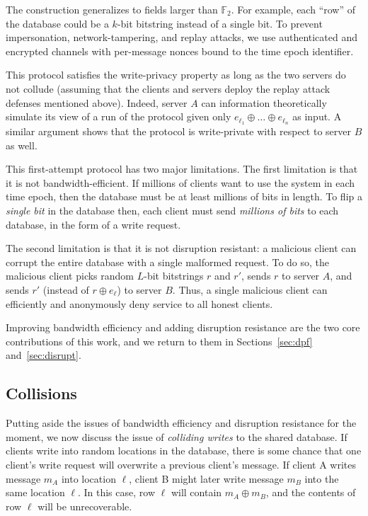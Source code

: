 \documentclass[10pt,twocolumn]{article}
\newcommand{\F}{\mathbb{F}}
\begin{document}
The construction generalizes to fields larger than $\F_2$.
For example, each ``row'' of the database could be a $k$-bit bitstring
instead of a single bit.
To prevent impersonation, network-tampering, and replay attacks, we 
use authenticated and encrypted channels with per-message nonces
bound to the time epoch identifier. 

\medskip

This protocol satisfies the write-privacy property
as long as the two servers do not collude (assuming that the clients
and servers deploy the replay attack defenses mentioned above).
Indeed, server $A$ can information theoretically simulate its view 
of a run of the protocol given only $e_{\ell_1} \oplus \dots \oplus e_{\ell_n}$ as input.
A similar argument shows that the protocol is write-private with
respect to server $B$ as well.

This first-attempt protocol has two major limitations.
The first limitation is that it is not bandwidth-efficient.
If millions of clients want to use the system in each time epoch, then 
the database must be at least millions of bits in length.
To flip a {\em single bit} in the database then, each client
must send {\em millions of bits} to each database,
in the form of a write request.

The second limitation is that it is not disruption resistant:
a malicious client can corrupt
the entire database with a single malformed request.
To do so, the malicious client picks random $L$-bit bitstrings
$r$ and $r'$, sends $r$ to server $A$, and sends $r'$ 
(instead of $r \oplus e_\ell$) to server $B$.
Thus, a single malicious client can efficiently
and anonymously deny service to all honest clients.

Improving bandwidth efficiency and adding
disruption resistance are the two core contributions
of this work, and we return to them in Sections~\ref{sec:dpf}
and~\ref{sec:disrupt}.


\subsection{Collisions} \label{sec:collisions}
Putting aside the issues of bandwidth efficiency and
disruption resistance for the moment, we now discuss
the issue of {\em colliding writes} to the shared database.
If clients write into random locations in the database,
there is some chance that one client's write request
will overwrite a previous client's message.
If client A writes message $m_A$ into location $\ell$,
client B might later write message $m_B$ into the
same location $\ell$.
In this case, row $\ell$ will contain $m_A \oplus m_B$, 
and the contents of row $\ell$ will be unrecoverable.
\end{document}
